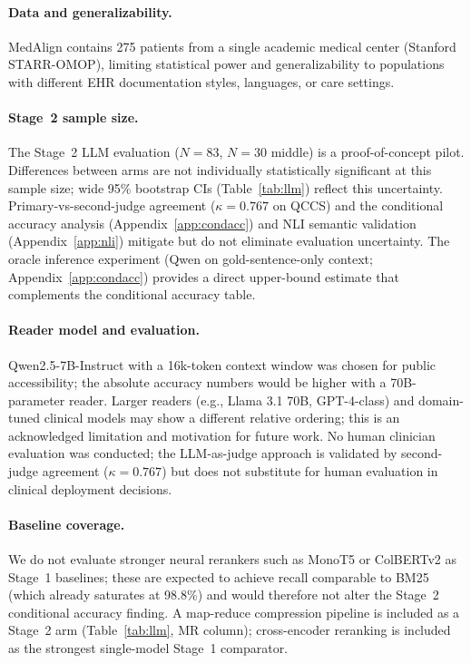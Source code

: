 \documentclass{article}
\begin{document}
\paragraph{Data and generalizability.}
MedAlign contains 275 patients from a single academic medical center (Stanford
STARR-OMOP), limiting statistical power and generalizability to populations with
different EHR documentation styles, languages, or care settings.

\paragraph{Stage~2 sample size.}
The Stage~2 LLM evaluation ($N{=}83$, $N{=}30$ middle) is a proof-of-concept pilot.
Differences between arms are not individually statistically significant at this sample
size; wide 95\% bootstrap CIs (Table~\ref{tab:llm}) reflect this uncertainty.
Primary-vs-second-judge agreement ($\kappa = 0.767$ on QCCS) and the conditional
accuracy analysis (Appendix~\ref{app:condacc}) and NLI semantic validation
(Appendix~\ref{app:nli}) mitigate but do not eliminate evaluation uncertainty.
The oracle inference experiment (Qwen on gold-sentence-only context;
Appendix~\ref{app:condacc}) provides a direct upper-bound estimate that complements
the conditional accuracy table.

\paragraph{Reader model and evaluation.}
Qwen2.5-7B-Instruct with a 16k-token context window was chosen for public
accessibility; the absolute accuracy numbers would be higher with a 70B-parameter
reader. Larger readers (e.g., Llama 3.1 70B, GPT-4-class) and domain-tuned clinical
models may show a different relative ordering; this is an acknowledged limitation
and motivation for future work. No human clinician evaluation was conducted; the
LLM-as-judge approach is validated by second-judge agreement ($\kappa = 0.767$) but
does not substitute for human evaluation in clinical deployment decisions.

\paragraph{Baseline coverage.}
We do not evaluate stronger neural rerankers such as MonoT5 or ColBERTv2 as Stage~1
baselines; these are expected to achieve recall comparable to BM25 (which already
saturates at 98.8\%) and would therefore not alter the Stage~2 conditional accuracy
finding. A map-reduce compression pipeline is included as a Stage~2 arm
(Table~\ref{tab:llm}, MR column); cross-encoder reranking is included as the
strongest single-model Stage~1 comparator.
\end{document}
